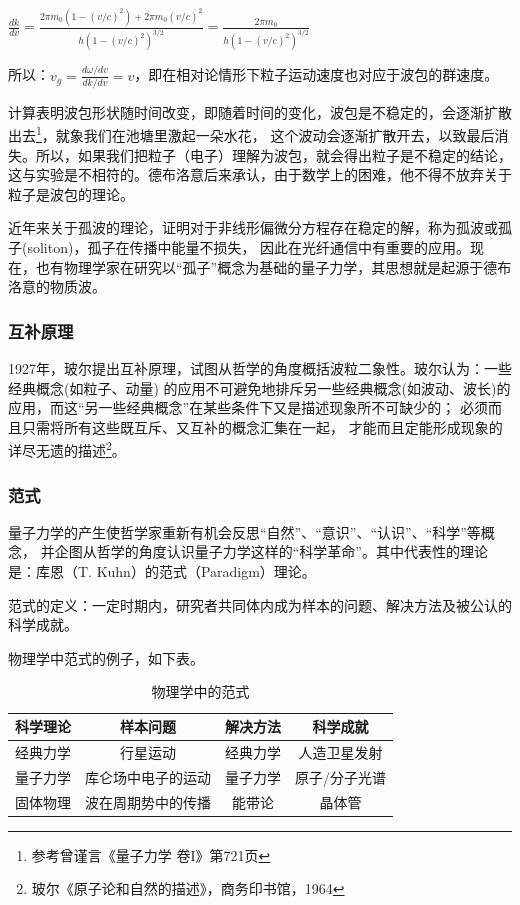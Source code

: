 $\frac{{dk}}{{dv}} = \frac{{2\pi m_0 \left( {1 - (v/c)^2 } \right) + 2\pi m_0 (v/c)^2 }}{{h\left( {1 - (v/c)^2 } \right)^{3/2} }} = \frac{{2\pi m_0 }}{{h\left( {1 - (v/c)^2 } \right)^{3/2} }}$

所以：$v_g  = \frac{{d\omega /dv}}{{dk/dv}} = v$，即在相对论情形下粒子运动速度也对应于波包的群速度。



计算表明波包形状随时间改变，即随着时间的变化，波包是不稳定的，会逐渐扩散出去\footnote{参考曾谨言《量子力学 卷I》第721页}，就象我们在池塘里激起一朵水花，
这个波动会逐渐扩散开去，以致最后消失。所以，如果我们把粒子（电子）理解为波包，就会得出粒子是不稳定的结论，
这与实验是不相符的。德布洛意后来承认，由于数学上的困难，他不得不放弃关于粒子是波包的理论。


近年来关于孤波的理论，证明对于非线形偏微分方程存在稳定的解，称为孤波或孤子(soliton)，孤子在传播中能量不损失，
因此在光纤通信中有重要的应用。现在，也有物理学家在研究以``孤子''概念为基础的量子力学，其思想就是起源于德布洛意的物质波。

\subsubsection*{互补原理}

1927年，玻尔提出互补原理，试图从哲学的角度概括波粒二象性。玻尔认为：一些经典概念(如粒子、动量)
的应用不可避免地排斥另一些经典概念(如波动、波长)的应用，而这``另一些经典概念''在某些条件下又是描述现象所不可缺少的；
必须而且只需将所有这些既互斥、又互补的概念汇集在一起，
才能而且定能形成现象的详尽无遗的描述\footnote{玻尔《原子论和自然的描述》，商务印书馆，1964}。

\subsubsection*{范式}

量子力学的产生使哲学家重新有机会反思``自然''、``意识''、``认识''、``科学''等概念，
并企图从哲学的角度认识量子力学这样的``科学革命''。其中代表性的理论是：库恩（T.
Kuhn）的范式（Paradigm）理论。

范式的定义：一定时期内，研究者共同体内成为样本的问题、解决方法及被公认的科学成就。

物理学中范式的例子，如下表。

\begin{table}[h]
\begin{center}
\caption{物理学中的范式}
\begin{tabular}{|c|c|c|c|}
\hline  科学理论 & 样本问题 & 解决方法 & 科学成就 \\
\hline  经典力学 & 行星运动 & 经典力学 & 人造卫星发射 \\
\hline  量子力学 & 库仑场中电子的运动 & 量子力学 & 原子/分子光谱 \\
\hline  固体物理 & 波在周期势中的传播 & 能带论 & 晶体管 \\
\hline
\end{tabular}
\end{center}
\end{table}

